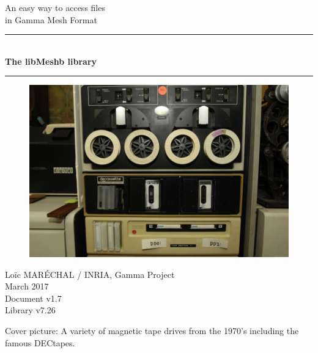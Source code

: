\documentclass[a4paper,12pt]{article}
\newcommand{\HRule}{\rule{\linewidth}{1mm}}
\begin{document}
%
%

\begin{titlepage}

\begin{center}
\huge An easy way to access files\\ in Gamma Mesh Format
\HRule \\
\medskip
{\Huge \bfseries The libMeshb library} \\
\HRule
\end{center}

\vfill

\begin{figure}[htbp]
\begin{center}
\includegraphics[width=14cm]{tape.jpeg}
\end{center}
\end{figure}

\vfill

\begin{flushright}
\Large Lo\"ic MAR\'ECHAL / INRIA, Gamma Project\\
\Large March 2017 \\
\normalsize Document v1.7 \\
\normalsize Library v7.26
\end{flushright}

\end{titlepage}

\clearpage

\setcounter{tocdepth}{2}
\tableofcontents
\vfill

\footnotesize{Cover picture: A variety of magnetic tape drives from the 1970’s including the famous DECtapes.}
\normalsize

\clearpage
\end{document}

